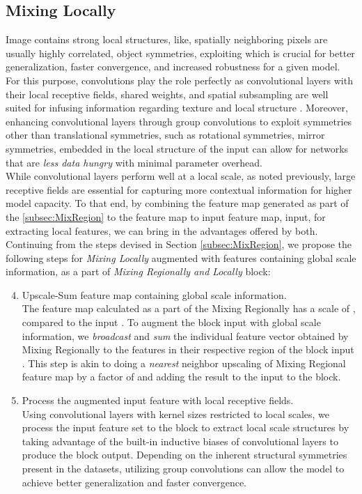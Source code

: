 \documentclass{article}
\begin{document}
\subsection{Mixing Locally} \label{subsec:MixLocal}
Image contains strong local structures, like, spatially neighboring pixels are usually highly correlated, object symmetries, exploiting which is crucial for better generalization, faster convergence, and increased robustness for a given model. For this purpose, convolutions play the role perfectly as convolutional layers with their local receptive fields, shared weights, and spatial subsampling \cite{LeCun1999} are well suited for infusing information regarding texture and local structure \cite{DBLP:journals/corr/texture-bias}. Moreover, enhancing convolutional layers through group convolutions \cite{DBLP:journals/corr/CohenW16, DSF-CNN} to exploit symmetries other than translational symmetries, such as rotational symmetries, mirror symmetries, embedded in the local structure of the input can allow for networks that are \textit{less data hungry} with minimal parameter overhead. \\
\indent While convolutional layers perform well at a local scale, as noted previously, large receptive fields are essential for capturing more contextual information for higher model capacity. To that end, by combining the feature map generated as part of the \ref{subsec:MixRegion} to the feature map to input feature map,   input, for extracting local features, we can bring in the advantages offered by both. \\
Continuing from the steps devised in Section \ref{subsec:MixRegion}, we propose the following steps for \textit{Mixing Locally} augmented with features containing global scale information, as a part of \textit{Mixing Regionally and Locally} block:
\begin{enumerate}
\setcounter{enumi}{3}
    \item Upscale-Sum feature map containing global scale information.\label{step:4} \\
    The feature map calculated as a part of the Mixing Regionally has a scale of , compared to the input . To augment the block input with global scale information, we \textit{broadcast} and \textit{sum} the individual feature vector obtained by Mixing Regionally to the features in their respective region of the block input . This step is akin to doing a \textit{nearest} neighbor upscaling of Mixing Regional feature map by a factor of  and adding the result to the input to the block. 
    \item Process the augmented input feature with local receptive fields. \\
    Using convolutional layers with kernel sizes restricted to local scales, we process the input feature set to the block to extract local scale structures by taking advantage of the built-in inductive biases of convolutional layers to produce the block output. Depending on the inherent structural symmetries present in the datasets, utilizing group convolutions can allow the model to achieve better generalization and faster convergence.  
\end{enumerate}
\end{document}
